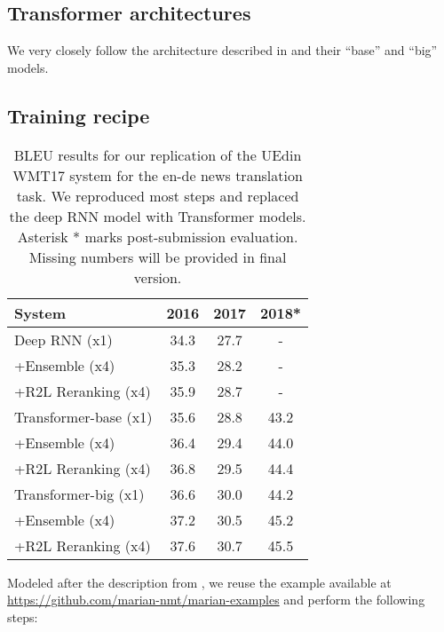 \documentclass[11pt,a4paper]{article}
\begin{document}
  \subsection{Transformer architectures}
  We very closely follow the architecture described in  and their ``base'' and ``big'' models. 



  \subsection{Training recipe}

  \begin{table}[t]
  \centering
  \begin{tabular}{lccc}\toprule
  System &	2016 &	2017 & 2018* \\ \midrule
  Deep RNN (x1) & 34.3 & 27.7 & - \\ 
  +Ensemble (x4) & 35.3 & 28.2 & - \\ 
  +R2L Reranking (x4) & 35.9 & 28.7 & - \\ \midrule
  Transformer-base (x1) &	35.6 &	28.8 & 43.2 \\
  +Ensemble (x4) &	36.4 &	29.4 & 44.0 \\ 
  +R2L Reranking (x4) &	36.8 &	29.5 & 44.4 \\ \midrule
  Transformer-big (x1) & 36.6 & 30.0 & 44.2 \\
  +Ensemble (x4) & 37.2 & 30.5 & 45.2 \\ 
  +R2L Reranking (x4) & 37.6 & 30.7 & 45.5 \\ 
  
  \bottomrule
  \end{tabular}
  \caption{BLEU results for our replication of the UEdin WMT17 system for the en-de news translation task.
  We reproduced most steps and replaced the deep RNN model with Transformer models. Asterisk * marks post-submission evaluation. Missing numbers will be provided in final version.}
  \label{wmt-bleu}
  \end{table}

Modeled after the description from , we reuse the example available at \url{https://github.com/marian-nmt/marian-examples} and perform the following steps:
\end{document}
